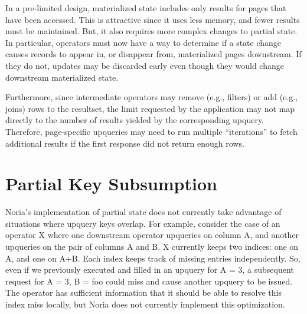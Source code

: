 In a pre-limited design, materialized state includes only results for pages that
have been accessed. This is attractive since it uses less memory, and fewer
results must be maintained. But, it also requires more complex changes to
partial state. In particular, operators must now have a way to determine if a
state change causes records to appear in, or disappear from, materialized pages
downstream. If they do not, updates may be discarded early even though they
would change downstream materialized state.

Furthermore, since intermediate operators may remove (e.g., filters) or add
(e.g., joins) rows to the resultset, the limit requested by the application may
not map directly to the number of results yielded by the corresponding upquery.
Therefore, page-specific upqueries may need to run multiple ``iterations'' to
fetch additional results if the first response did not return enough rows.

\section{Partial Key Subsumption}

Noria's implementation of partial state does not currently take advantage of
situations where upquery keys overlap. For example, consider the case of an
operator X where one downstream operator upqueries on column A, and another
upqueries on the pair of columns A and B. X currently keeps two indices: one on
A, and one on A+B. Each index keeps track of missing entries independently. So,
even if we previously executed and filled in an upquery for A = 3, a subsequent
request for A = 3, B = foo could miss and cause another upquery to be issued.
The operator has sufficient information that it should be able to resolve this
index miss locally, but Noria does not currently implement this optimization.
